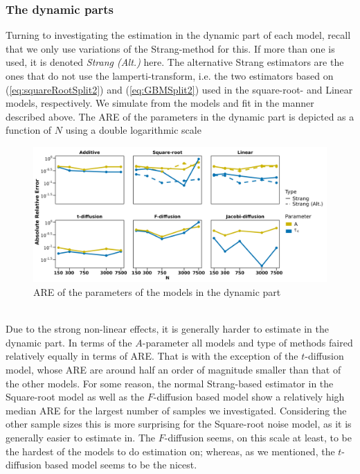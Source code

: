 \subsubsection{The dynamic parts}
Turning to investigating the estimation in the dynamic part of each model, recall that we only use variations of the Strang-method for this. If more than one is used, it is denoted \textit{Strang (Alt.)} here. The alternative Strang estimators are the ones that do not use the lamperti-transform, i.e. the two estimators based on (\ref{eq:squareRootSplit2}) and (\ref{eq:GBMSplit2}) used in the square-root- and Linear models, respectively. We simulate from the models and fit in the manner described above. The ARE of the parameters in the dynamic part is depicted as a function of $N$ using a double logarithmic scale 
\begin{figure}[h!]
    \begin{center}
    \includegraphics[scale = .1]{figures/parameter_precision_dynamic.jpeg}
    \caption{ARE of the parameters of the models in the dynamic part}
    \label{figure:parameter_precision_dynamic}        
\end{center}
\end{figure}\\
Due to the strong non-linear effects, it is generally harder to estimate in the dynamic part. In terms of the $A$-parameter all models and type of methods faired relatively equally in terms of ARE. That is with the exception of the $t$-diffusion model, whose ARE are around half an order of magnitude smaller than that of the other models. For some reason, the normal Strang-based estimator in the Square-root model as well as the $F$-diffusion based model show a relatively high median ARE for the largest number of samples we investigated.  Considering the other sample sizes this is more surprising for the Square-root noise model, as it is generally easier to estimate in. The $F$-diffusion seems, on this scale at least, to be the hardest of the models to do estimation on; whereas, as we mentioned, the $t$-diffusion based model seems to be the nicest. 

